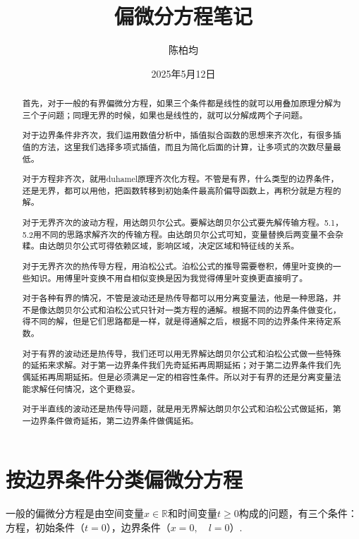 \documentclass[12pt,a4paper]{article}
\title{偏微分方程笔记}
\author{陈柏均}
\date{2025年5月12日}
\newcommand{\R}{\mathbb{R}}
\numberwithin{subsection}{section}   %
\numberwithin{subsubsection}{subsection}
\theoremstyle{plain}
\theoremstyle{definition}
\theoremstyle{remark}
\theoremstyle{remark}
\begin{document}
	
	\maketitle

 \begin{abstract}
	 首先，对于一般的有界偏微分方程，如果三个条件都是线性的就可以用叠加原理分解为三个子问题；同理无界的时候，如果也是线性的，就可以分解成两个子问题。
	 
	 对于边界条件非齐次，我们运用数值分析中，插值拟合函数的思想来齐次化，有很多插值的方法，这里我们选择多项式插值，而且为简化后面的计算，让多项式的次数尽量最低。
	 
	 对于方程非齐次，就用duhamel原理齐次化方程。不管是有界，什么类型的边界条件，还是无界，都可以用他，把函数转移到初始条件最高阶偏导函数上，再积分就是方程的解。
	 
	 对于无界齐次的波动方程，用达朗贝尔公式。要解达朗贝尔公式要先解传输方程。5.1，5.2用不同的思路求解齐次的传输方程。由达朗贝尔公式可知，变量替换后两变量不会杂糅。由达朗贝尔公式可得依赖区域，影响区域，决定区域和特征线的关系。
	 
	 对于无界齐次的热传导方程，用泊松公式。泊松公式的推导需要卷积，傅里叶变换的一些知识。用傅里叶变换不用自相似变换是因为我觉得傅里叶变换更直接明了。
	 
	 对于各种有界的情况，不管是波动还是热传导都可以用分离变量法，他是一种思路，并不是像达朗贝尔公式和泊松公式只针对一类方程的通解。根据不同的边界条件做变化，得不同的解，但是它们思路都是一样，就是得通解之后，根据不同的边界条件来待定系数。
	 
	 对于有界的波动还是热传导，我们还可以用无界解达朗贝尔公式和泊松公式做一些特殊的延拓来求解。对于第一边界条件我们先奇延拓再周期延拓；对于第二边界条件我们先偶延拓再周期延拓。但是必须满足一定的相容性条件。所以对于有界的还是分离变量法能求解任何情况，这个更稳妥。
	 
	 对于半直线的波动还是热传导问题，就是用无界解达朗贝尔公式和泊松公式做延拓，第一边界条件做奇延拓，第二边界条件做偶延拓。
\end{abstract}


\newpage
	
	\tableofcontents  %
	
	
	\newpage
	\section{按边界条件分类偏微分方程}
	一般的偏微分方程是由空间变量$x \in \R$和时间变量$t \geq 0$构成的问题，有三个条件：方程，初始条件（$t=0$），边界条件（$x=0, \quad l=0$）.
	  
\end{document}

